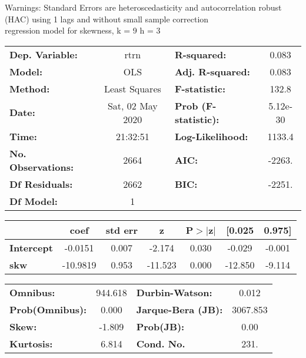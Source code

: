 Warnings: \newline
 [1] Standard Errors are heteroscedasticity and autocorrelation robust (HAC) using 1 lags and without small sample correction\\ 

regression model for skewness, k = 9 h = 3\begin{center}
\begin{tabular}{lclc}
\toprule
\textbf{Dep. Variable:}    &       rtrn       & \textbf{  R-squared:         } &     0.083   \\
\textbf{Model:}            &       OLS        & \textbf{  Adj. R-squared:    } &     0.083   \\
\textbf{Method:}           &  Least Squares   & \textbf{  F-statistic:       } &     132.8   \\
\textbf{Date:}             & Sat, 02 May 2020 & \textbf{  Prob (F-statistic):} &  5.12e-30   \\
\textbf{Time:}             &     21:32:51     & \textbf{  Log-Likelihood:    } &    1133.4   \\
\textbf{No. Observations:} &        2664      & \textbf{  AIC:               } &    -2263.   \\
\textbf{Df Residuals:}     &        2662      & \textbf{  BIC:               } &    -2251.   \\
\textbf{Df Model:}         &           1      & \textbf{                     } &             \\
\bottomrule
\end{tabular}
\begin{tabular}{lcccccc}
                   & \textbf{coef} & \textbf{std err} & \textbf{z} & \textbf{P$> |$z$|$} & \textbf{[0.025} & \textbf{0.975]}  \\
\midrule
\textbf{Intercept} &      -0.0151  &        0.007     &    -2.174  &         0.030        &       -0.029    &       -0.001     \\
\textbf{skw}       &     -10.9819  &        0.953     &   -11.523  &         0.000        &      -12.850    &       -9.114     \\
\bottomrule
\end{tabular}
\begin{tabular}{lclc}
\textbf{Omnibus:}       & 944.618 & \textbf{  Durbin-Watson:     } &    0.012  \\
\textbf{Prob(Omnibus):} &   0.000 & \textbf{  Jarque-Bera (JB):  } & 3067.853  \\
\textbf{Skew:}          &  -1.809 & \textbf{  Prob(JB):          } &     0.00  \\
\textbf{Kurtosis:}      &   6.814 & \textbf{  Cond. No.          } &     231.  \\
\bottomrule
\end{tabular}
\end{center}

